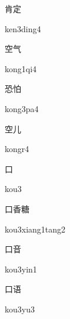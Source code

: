 \begin{verbete}{肯定}
\begin{pronuncia}{ken3ding4}
\end{pronuncia}
\end{verbete}

\begin{verbete}[kong1qi4]{空气}
\begin{pronuncia}{kong1qi4}
\end{pronuncia}
\end{verbete}

\begin{verbete}[kong3pa4]{恐怕}
\begin{pronuncia}{kong3pa4}
\end{pronuncia}
\end{verbete}

\begin{verbete}[kongr4]{空儿}
\begin{pronuncia}{kongr4}
\end{pronuncia}
\end{verbete}

\begin{verbete}[kou3]{口}
\begin{pronuncia}{kou3}
\end{pronuncia}
\end{verbete}

\begin{verbete}{口香糖}
\begin{pronuncia}{kou3xiang1tang2}
\end{pronuncia}
\end{verbete}

\begin{verbete}{口音}
\begin{pronuncia}{kou3yin1}
\end{pronuncia}
\end{verbete}

\begin{verbete}[kou3yu3]{口语}
\begin{pronuncia}{kou3yu3}
\end{pronuncia}
\end{verbete}

